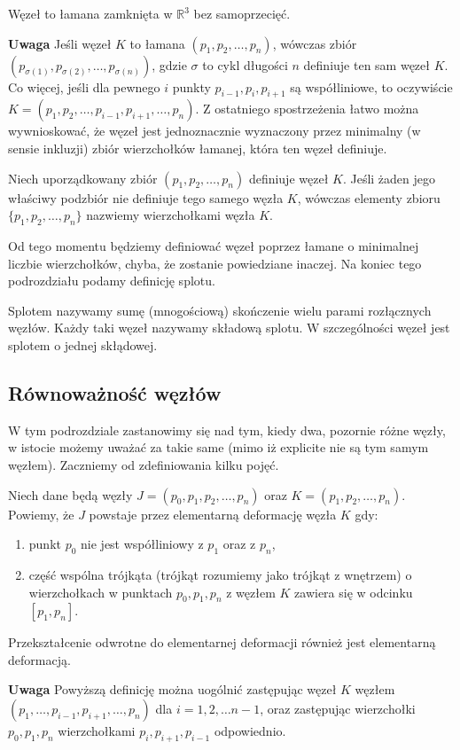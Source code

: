 \begin{definicja}
 Węzeł to łamana zamknięta w $\mathbb{R}^3$ bez samoprzecięć.
\end{definicja}

\textbf{Uwaga} Jeśli węzeł $K$ to łamana $(p_1, p_2, \ldots, p_n)$, wówczas zbiór $(p_{\sigma(1)}, p_{\sigma(2)},\ldots, p_{\sigma(n)})$, gdzie $\sigma$ to cykl długości $n$
definiuje ten sam węzeł $K$.
Co więcej, jeśli dla pewnego $i$ punkty $p_{i-1}, p_i, p_{i+1}$ są współliniowe, to oczywiście $K = (p_1, p_2, \ldots, p_{i-1}, p_{i+1}, \ldots, p_n)$. Z ostatniego spostrzeżenia łatwo
można wywnioskować, że węzeł jest jednoznacznie wyznaczony przez minimalny (w sensie inkluzji) zbiór wierzchołków łamanej, która ten węzeł definiuje. 

\begin{definicja}
 Niech uporządkowany zbiór $(p_1, p_2,\ldots, p_n)$ definiuje węzeł $K$. Jeśli żaden jego właściwy podzbiór nie definiuje tego samego węzła $K$, wówczas elementy zbioru $\lbrace p_1, p_2, \ldots, p_n\rbrace$
 nazwiemy wierzchołkami węzła $K$.
\end{definicja}

Od tego momentu będziemy definiować węzeł poprzez łamane o minimalnej liczbie wierzchołków, chyba, że zostanie powiedziane inaczej. Na koniec tego podrozdziału podamy definicję splotu.

\begin{definicja}
 Splotem nazywamy sumę (mnogościową) skończenie wielu parami rozłącznych węzłów. Każdy taki węzeł nazywamy składową splotu. W szczególności węzeł jest splotem o jednej skłądowej. 
\end{definicja}

\subsection{Równoważność węzłów}
W tym podrozdziale zastanowimy się nad tym, kiedy dwa, pozornie różne węzły, w istocie możemy uważać za takie same (mimo iż explicite nie są tym samym węzłem). 
Zaczniemy od zdefiniowania kilku pojęć.

\begin{definicja}
\label{elementarne_p}
 Niech dane będą węzły $J = (p_0, p_1, p_2, \ldots, p_n)$ oraz $K = (p_1, p_2, \ldots, p_n)$. 
 Powiemy, że $J$ powstaje przez elementarną deformację węzła $K$ gdy: 
 \begin{enumerate}
  \item punkt $p_0$ nie jest współliniowy z $p_{1}$ oraz z $p_{n}$,
  \item część wspólna trójkąta (trójkąt rozumiemy jako trójkąt z wnętrzem) o wierzchołkach w punktach $p_0, p_1, p_n$ z węzłem $K$ zawiera się w odcinku $[p_1, p_n]$.
 \end{enumerate}
 Przekształcenie odwrotne do elementarnej deformacji również jest elementarną deformacją.
\end{definicja}
\textbf{Uwaga} Powyższą definicję można uogólnić zastępując węzeł $K$ węzłem $(p_1,\ldots, p_{i-1},p_{i+1}, \ldots, p_n)$ dla $i = 1,2,\ldots n-1$, oraz zastępując wierzchołki
$p_0, p_1, p_n$ wierzchołkami $p_i, p_{i+1}, p_{i-1}$ odpowiednio.

